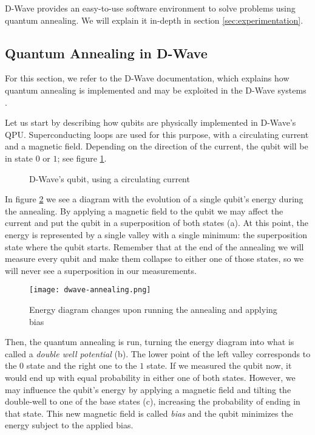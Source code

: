 D-Wave provides an easy-to-use software environment to solve problems using quantum annealing. We will explain it in-depth in section \ref{sec:experimentation}.


\subsection{Quantum Annealing in D-Wave}
\label{sec:quantum-annealing-dwave}


For this section, we refer to the D-Wave documentation, which explains how quantum annealing is implemented and may be exploited in the D-Wave systems \cite{DWaveDoc-QuantumAnnealing}.

Let us start by describing how qubits are physically implemented in D-Wave's QPU. Superconducting loops are used for this purpose, with a circulating current and a magnetic field. Depending on the direction of the current, the qubit will be in state $0$ or $1$; see figure \ref{fig:dwave-qubit}.

\begin{figure}[h]
	\centering
	\caption{D-Wave's qubit, using a circulating current \cite{DWaveDoc-QuantumAnnealing}}
	\label{fig:dwave-qubit}
\end{figure}

In figure \ref{fig:dwave-annealing} we see a diagram with the evolution of a single qubit's energy during the annealing. By applying a magnetic field to the qubit we may affect the current and put the qubit in a superposition of both states (a). At this point, the energy is represented by a single valley with a single minimum: the superposition state where the qubit starts. Remember that at the end of the annealing we will measure every qubit and make them collapse to either one of those states, so we will never see a superposition in our measurements.

\begin{figure}[h]
	\texttt{[image: dwave-annealing.png]}
	\centering
	\caption{Energy diagram changes upon running the annealing and applying bias \cite{DWaveDoc-QuantumAnnealing}}
	\label{fig:dwave-annealing}
\end{figure}

Then, the quantum annealing is run, turning the energy diagram into what is called a \emph{double well potential} (b). The lower point of the left valley corresponds to the $0$ state and the right one to the $1$ state. If we measured the qubit now, it would end up with equal probability in either one of both states. However, we may influence the qubit's energy by applying a magnetic field and tilting the double-well to one of the base states (c), increasing the probability of ending in that state. This new magnetic field is called \emph{bias} and the qubit minimizes the energy subject to the applied bias.

